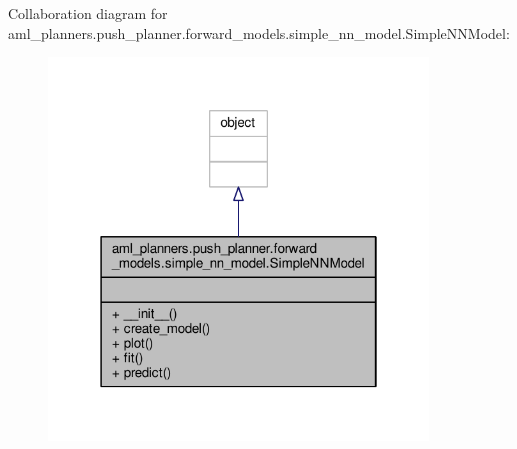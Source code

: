 Collaboration diagram for aml\-\_\-planners.\-push\-\_\-planner.\-forward\-\_\-models.\-simple\-\_\-nn\-\_\-model.\-Simple\-N\-N\-Model\-:
\nopagebreak
\begin{figure}[H]
\begin{center}
\leavevmode
\includegraphics[width=286pt]{classaml__planners_1_1push__planner_1_1forward__models_1_1simple__nn__model_1_1_simple_n_n_model__coll__graph}
\end{center}
\end{figure}
